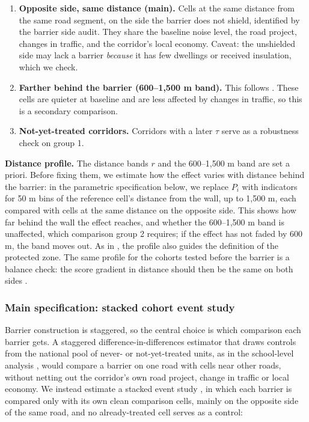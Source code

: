\documentclass[11pt]{article}
\begin{document}
\begin{enumerate}
\item \textbf{Opposite side, same distance (main).} Cells at the same distance from the same road segment, on the side the barrier does not shield, identified by the barrier side audit. They share the baseline noise level, the road project, changes in traffic, and the corridor's local economy. Caveat: the unshielded side may lack a barrier \emph{because} it has few dwellings or received insulation, which we check.
\item \textbf{Farther behind the barrier (600--1,500 m band).} This follows \textcite{morettiTrafficNoiseExternality2025}. These cells are quieter at baseline and are less affected by changes in traffic, so this is a secondary comparison.
\item \textbf{Not-yet-treated corridors.} Corridors with a later \(\tau\) serve as a robustness check on group 1.
\end{enumerate}

\textbf{Distance profile.} The distance bands \(r\) and the 600--1,500 m band are set a priori. Before fixing them, we estimate how the effect varies with distance behind the barrier: in the parametric specification below, we replace \(P_i\) with indicators for 50 m bins of the reference cell's distance from the wall, up to 1,500 m, each compared with cells at the same distance on the opposite side. This shows how far behind the wall the effect reaches, and whether the 600--1,500 m band is unaffected, which comparison group 2 requires; if the effect has not faded by 600 m, the band moves out. As in \textcite{hollingsworthThousandCutsCumulative2025}, the profile also guides the definition of the protected zone. The same profile for the cohorts tested before the barrier is a balance check: the score gradient in distance should then be the same on both sides \autocite[as in][]{berkhoutLeadExposureCognitive2025}.

\subsubsection{Main specification: stacked cohort event study}

Barrier construction is staggered, so the central choice is which comparison each barrier gets. A staggered difference-in-differences estimator that draws controls from the national pool of never- or not-yet-treated units, as in the school-level analysis \autocite{callawayDifferenceinDifferencesMultipleTime2021}, would compare a barrier on one road with cells near other roads, without netting out the corridor's own road project, change in traffic or local economy. We instead estimate a stacked event study \autocite{cengizEffectMinimumWages2019}, in which each barrier is compared only with its own clean comparison cells, mainly on the opposite side of the same road, and no already-treated cell serves as a control:
\end{document}
